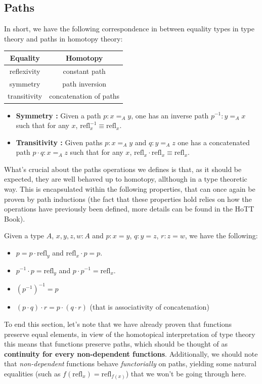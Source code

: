 \documentclass{report}
\begin{document}
\subsection{Paths}
In short, we have the following correspondence in between equality types in type theory and paths in homotopy theory:
\begin{center}
\begin{tabular}{|c|c|}
  \hline Equality & Homotopy \\
  \hline reflexivity & constant path \\
  \hline symmetry  & path inversion \\
  \hline transitivity & concatenation of paths \\
  \hline
\end{tabular}
\end{center}
\begin{itemize}
  \item \textbf{Symmetry : } Given a path $p : x =_A y$, one has an inverse path $p^{-1} : y =_A x$ such that for any $x$, $\mathrm{refl}_x^{-1} \equiv \mathrm{refl}_x$.
  \item \textbf{Transitivity : } Given paths $p : x =_A y$ and $q : y =_A z$ one has a concatenated path $p \cdot q : x =_A z$ such that for any $x$, $\mathrm{refl}_x \cdot \mathrm{refl}_x \equiv \mathrm{refl}_x$.
\end{itemize}


What's crucial about the paths operations we defines is that, as it should be expected, they are well behaved up to homotopy, allthough in a type theoretic way. This is encapsulated within the following properties, that can once again be proven by path inductions (the fact that these properties hold relies on how the operations have previously been defined, more details can be found in the HoTT Book\cite{hott}).
\begin{prop}
  Given a type $A$, $x,y,z,w : A$ and $p : x=y$, $q : y=z$, $r : z=w$, we have the following:
  \begin{itemize}
    \item $p = p \cdot \mathrm{refl}_y$ and $ \mathrm{refl}_x \cdot p = p$. 
    \item $p^{-1} \cdot p = \mathrm{refl}_y$ and $p \cdot p^{-1} = \mathrm{refl}_x$.
    \item $(p^{-1})^{-1} = p$
    \item $(p \cdot q) \cdot r = p \cdot (q \cdot r)$ (that is associativity of concatenation)
  \end{itemize}
\end{prop}
To end this section, let's note that we have already proven that functions preserve equal elements, in view of the homotopical interpretation of type theory this means that functions preserve paths, which should be thought of as \textbf{continuity for every non-dependent functions}. Additionally, we should note that \emph{non-dependent} functions behave \textit{functorially} on paths, yielding some natural equalities (such as $f(\mathrm{refl}_x)=\mathrm{refl}_{f(x)}$) that we won't be going through here.
\end{document}

